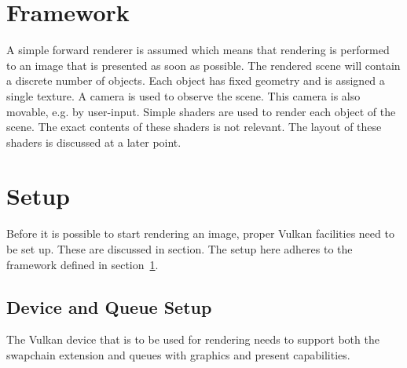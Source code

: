   \section{Framework}
    \label{sec:Framework}
    A simple forward renderer is assumed which means that rendering is performed to an image that is presented as soon as possible.
    The rendered scene will contain a discrete number of objects.
    Each object has fixed geometry and is assigned a single texture.
    A camera is used to observe the scene.
    This camera is also movable, e.g. by user-input.
    Simple shaders are used to render each object of the scene.
    The exact contents of these shaders is not relevant.
    The layout of these shaders is discussed at a later point.


  \section{Setup}
  \label{sec:RenderingSetup}
    Before it is possible to start rendering an image, proper Vulkan facilities need to be set up.
    These are discussed in section.
    The setup here adheres to the framework defined in section~\ref{sec:Framework}.

    \subsection{Device and Queue Setup}
      The Vulkan device that is to be used for rendering needs to support both the swapchain extension and queues with graphics and present capabilities.

